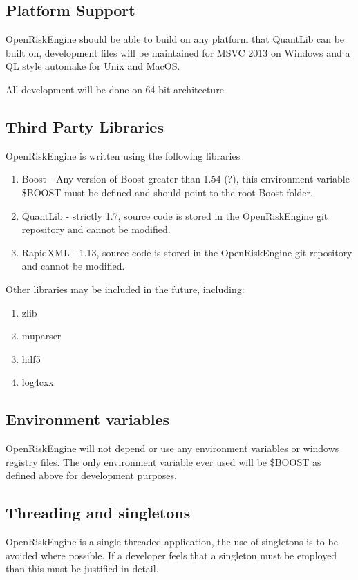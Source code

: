 \documentclass[12pt, a4paper]{article}
\begin{document}
\subsection*{Platform Support}
OpenRiskEngine should be able to build on any platform that QuantLib can be built on, development files will be maintained for MSVC 2013 on Windows and a QL style automake for Unix and MacOS.

All development will be done on 64-bit architecture.

\subsection*{Third Party Libraries}
OpenRiskEngine is written using the following libraries
\begin{enumerate}
\item Boost - Any version of Boost greater than 1.54 (?), this environment variable \$BOOST must be defined and should point to the root Boost folder.
\item QuantLib - strictly 1.7, source code is stored in the OpenRiskEngine git repository and cannot be modified.
\item RapidXML - 1.13, source code is stored in the OpenRiskEngine git repository and cannot be modified.
\end{enumerate}
Other libraries may be included in the future, including:
\begin{enumerate}
\item zlib
\item muparser
\item hdf5
\item log4cxx
\end{enumerate}

\subsection*{Environment variables}
OpenRiskEngine will not depend or use any environment variables or windows registry files. The only environment variable ever used will be \$BOOST as defined above for development purposes.

\subsection*{Threading and singletons}
OpenRiskEngine is a single threaded application, the use of singletons is to be avoided where possible. If a developer feels that a singleton must be employed than this must be justified in detail.
\end{document}
